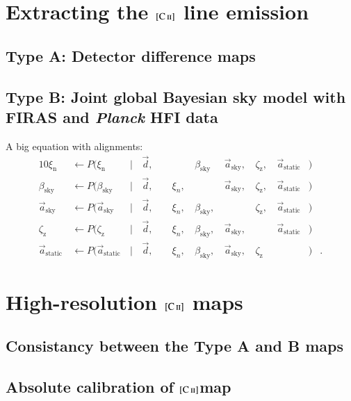 \documentclass{aa}
\def\Planck{\textit{Planck}}
\newcommand{\CII}{\ensuremath{[\textsc{C\,ii}]}}
\newcommand{\dv}[0]{\vec{d}}
\renewcommand{\a}[0]{\vec{a}}
\begin{document}
\section{Extracting the \CII{} line emission}

\subsection{Type A: Detector difference maps}
\subsection{Type B: Joint global Bayesian sky model with FIRAS and \Planck{} HFI data}
A big equation with alignments:
\begin{alignat}{10}
\xi_{\mathrm{n}} &\,\leftarrow P(\xi_{\mathrm{n}}&\,\mid &\,\dv,&\, &\,\phantom{\xi_n} &
\,\beta_{\mathrm{sky}}& \,\a_{\mathrm{sky}}, &\,\zeta_{\mathrm{z}},
&\,\a_{\mathrm{static}}&)\label{eq:gibbs_n}\\
\beta_{\mathrm{sky}} &\,\leftarrow P(\beta_{\mathrm{sky}}&\,\mid &\,\dv,&\, &\,\xi_n, &
\,\phantom{\beta_{\mathrm{sky}}}& \,\a_{\mathrm{sky}}, &\,\zeta_{\mathrm{z}}, &\,\a_{\mathrm{static}}&)\\
\a_{\mathrm{sky}} &\,\leftarrow P(\a_{\mathrm{sky}}&\,\mid &\,\dv,&\, &\,\xi_n, &
\,\beta_{\mathrm{sky}},& \,\phantom{\a_{\mathrm{sky}},}
&\,\zeta_{\mathrm{z}}, &\,\a_{\mathrm{static}}&)\\
\zeta_{\mathrm{z}} &\,\leftarrow P(\zeta_{\mathrm{z}}&\,\mid &\,\dv,&\, &\,\xi_n, &
\,\beta_{\mathrm{sky}},& \,\a_{\mathrm{sky}},
&\,\phantom{\zeta_{\mathrm{z}},} &\,\a_{\mathrm{static}}&)\label{eq:gibbs_zodi}\\
\a_{\mathrm{static}} &\,\leftarrow P(\a_{\mathrm{static}}&\,\mid &\,\dv,&\, &\,\xi_n, &
	\,\beta_{\mathrm{sky}},& \,\a_{\mathrm{sky}}, &\,\zeta_{\mathrm{z}} &\,\phantom{\a_{\mathrm{static}}}&)&.\label{eq:gibbs_static}
\end{alignat}

\section{High-resolution \CII{} maps}
\subsection{Consistancy between the Type A and B maps}
\subsection{Absolute calibration of \CII map}
\end{document}
